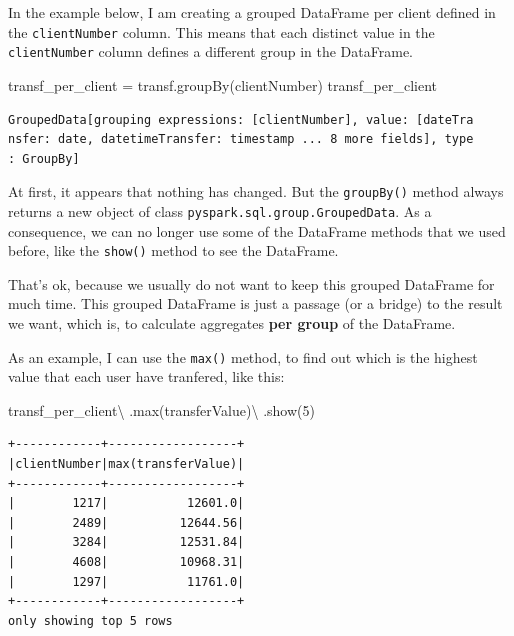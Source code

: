 \documentclass[
  11pt,
  letterpaper,
  DIV=11,
  numbers=noendperiod]{scrreprt}
\newenvironment{Shaded}{\begin{snugshade}}{\end{snugshade}}
\newcommand{\BuiltInTok}[1]{\textcolor[rgb]{0.00,0.23,0.31}{#1}}
\newcommand{\DecValTok}[1]{\textcolor[rgb]{0.68,0.00,0.00}{#1}}
\newcommand{\NormalTok}[1]{\textcolor[rgb]{0.00,0.23,0.31}{#1}}
\newcommand{\OperatorTok}[1]{\textcolor[rgb]{0.37,0.37,0.37}{#1}}
\newcommand{\StringTok}[1]{\textcolor[rgb]{0.13,0.47,0.30}{#1}}
\begin{document}
In the example below, I am creating a grouped DataFrame per client
defined in the \texttt{clientNumber} column. This means that each
distinct value in the \texttt{clientNumber} column defines a different
group in the DataFrame.

\begin{Shaded}
\begin{Highlighting}[]
\NormalTok{transf\_per\_client }\OperatorTok{=}\NormalTok{ transf.groupBy(}\StringTok{\textquotesingle{}clientNumber\textquotesingle{}}\NormalTok{)}
\NormalTok{transf\_per\_client}
\end{Highlighting}
\end{Shaded}

\begin{verbatim}
GroupedData[grouping expressions: [clientNumber], value: [dateTra
nsfer: date, datetimeTransfer: timestamp ... 8 more fields], type
: GroupBy]
\end{verbatim}

At first, it appears that nothing has changed. But the
\texttt{groupBy()} method always returns a new object of class
\texttt{pyspark.sql.group.GroupedData}. As a consequence, we can no
longer use some of the DataFrame methods that we used before, like the
\texttt{show()} method to see the DataFrame.

That's ok, because we usually do not want to keep this grouped DataFrame
for much time. This grouped DataFrame is just a passage (or a bridge) to
the result we want, which is, to calculate aggregates \textbf{per group}
of the DataFrame.

As an example, I can use the \texttt{max()} method, to find out which is
the highest value that each user have tranfered, like this:

\begin{Shaded}
\begin{Highlighting}[]
\NormalTok{transf\_per\_client}\OperatorTok{\textbackslash{}}
\NormalTok{  .}\BuiltInTok{max}\NormalTok{(}\StringTok{\textquotesingle{}transferValue\textquotesingle{}}\NormalTok{)}\OperatorTok{\textbackslash{}}
\NormalTok{  .show(}\DecValTok{5}\NormalTok{)}
\end{Highlighting}
\end{Shaded}

\begin{verbatim}
+------------+------------------+
|clientNumber|max(transferValue)|
+------------+------------------+
|        1217|           12601.0|
|        2489|          12644.56|
|        3284|          12531.84|
|        4608|          10968.31|
|        1297|           11761.0|
+------------+------------------+
only showing top 5 rows
\end{verbatim}
\end{document}
